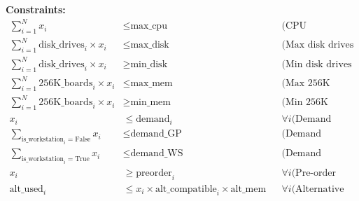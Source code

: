 \documentclass{article}
\begin{document}
\textbf{Constraints:}
\begin{align*}
\sum_{i=1}^{N} x_i &\leq \text{max\_cpu} && \text{(CPU constraint)} \\
\sum_{i=1}^{N} \text{disk\_drives}_i \times x_i &\leq \text{max\_disk} && \text{(Max disk drives constraint)} \\
\sum_{i=1}^{N} \text{disk\_drives}_i \times x_i &\geq \text{min\_disk} && \text{(Min disk drives constraint)} \\
\sum_{i=1}^{N} \text{256K\_boards}_i \times x_i &\leq \text{max\_mem} && \text{(Max 256K memory boards constraint)} \\
\sum_{i=1}^{N} \text{256K\_boards}_i \times x_i &\geq \text{min\_mem} && \text{(Min 256K memory boards constraint)} \\
x_i &\leq \text{demand}_i && \forall i \text{(Demand constraint for each system)} \\
\sum_{\text{is\_workstation}_i = \text{False}} x_i &\leq \text{demand\_GP} && \text{(Demand constraint for GP systems)} \\
\sum_{\text{is\_workstation}_i = \text{True}} x_i &\leq \text{demand\_WS} && \text{(Demand constraint for WS systems)} \\
x_i &\geq \text{preorder}_i && \forall i \text{(Pre-order fulfillment)} \\
\text{alt\_used}_i &\leq x_i \times \text{alt\_compatible}_i \times \text{alt\_mem} && \forall i \text{(Alternative memory usage constraint)} \\
\end{align*}
\end{document}
